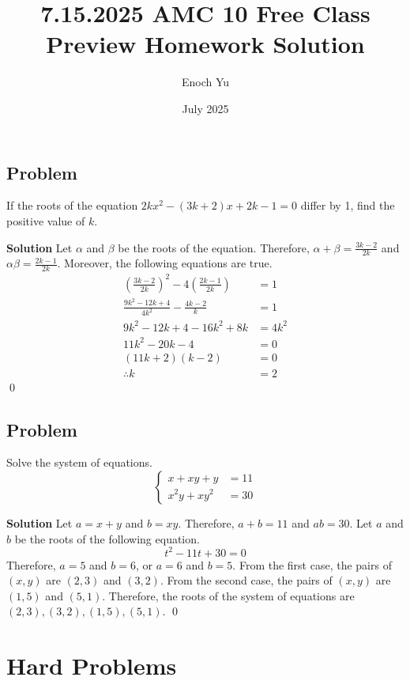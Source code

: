 \documentclass{article}
\title{7.15.2025 AMC 10 Free Class Preview Homework Solution}
\author{Enoch Yu}
\date{July 2025}
\newenvironment{solution}{\begin{trivlist}\item[]{\bf Solution}}{\qed \end{trivlist}}
\begin{document}
\maketitle

\subsection*{Problem}
If the roots of the equation $2kx^2 - (3k + 2)x + 2k - 1
= 0$ differ by 1, find the positive value of $k$.

\begin{solution}
Let $\alpha$ and $\beta$ be the roots of the equation.
Therefore, $\alpha + \beta = \frac{3k - 2}{2k}$ and
$\alpha\beta = \frac{2k - 1}{2k}$. Moreover, the following
equations are true.
\begin{align*}
    \left( \frac{3k - 2}{2k} \right)^2
        - 4 \left( \frac{2k - 1}{2k} \right) &= 1 \\
    \frac{9k^2 - 12k + 4}{4k^2} - \frac{4k - 2}{k} &= 1 \\
    9k^2 - 12k + 4 - 16k^2 + 8k &= 4k^2 \\
    11k^2 - 20k - 4 &= 0 \\
    (11k + 2)(k - 2) &= 0 \\
    \therefore k &= \boxed{2}
\end{align*}
\end{solution}

\subsection*{Problem}
Solve the system of equations.
\[
\begin{cases}
    x + xy + y &= 11 \\
    x^2y + xy^2 &= 30
\end{cases}
\]
\begin{solution}
Let $a = x + y$ and $b = xy$. Therefore, $a + b = 11$
and $ab = 30$. Let $a$ and $b$ be the roots of the
following equation.
\[
t^2 - 11t + 30 = 0
\]
Therefore, $a = 5$ and $b = 6$, or $a = 6$ and $b = 5$.
From the first case, the pairs of $(x, y)$ are $(2, 3)$
and $(3, 2)$. From the second case, the pairs of $(x, y)$
are $(1, 5)$ and $(5, 1)$. Therefore, the roots of the
system of equations are $\boxed{(2, 3), (3, 2), (1, 5), (5, 1)}$.
\end{solution}

\section*{\textcolor{BrickRed}{Hard Problems}}
\end{document}
